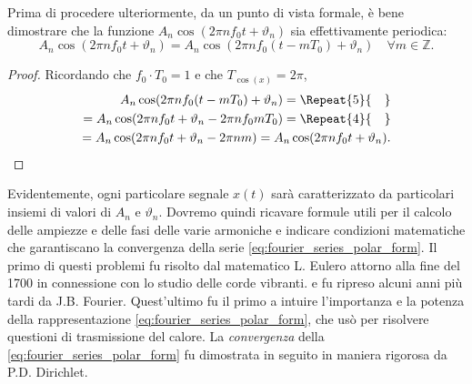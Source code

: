 \documentclass[12pt,oneside,openany]{memoir}
\numberwithin{equation}{subsection}
\newcommand{\quads}[1]{\Repeat{#1}{\quad}}
\begin{document}
\bigbreak
Prima di procedere ulteriormente, da un punto di vista formale, \`e bene
dimostrare che la funzione $A_n \cos(2 \pi n f_0 t + \vartheta_n)$ sia
effettivamente periodica:
\[
	A_n \cos(2 \pi n f_0 t + \vartheta_n) = A_n \cos(2 \pi n f_0 (t - mT_0)
	+ \vartheta_n) \quad \forall m \in \mathbb{Z}.
\]
\begin{proof}
Ricordando che $f_0 \cdot T_0 = 1$ e che $T_{\cos(x)} = 2\pi$,
\begin{equation}
\begin{split}
	A_n \cos(2 \pi n f_0 (t - mT_0) + \vartheta_n) =
	\quads{5}
	\\
	= A_n \cos(2 \pi n f_0 t + \vartheta_n - 2 \pi n f_0 m T_0) =
	\quads{4}
	\\
	= A_n \cos(2 \pi n f_0 t + \vartheta_n - 2 \pi n m) = A_n
	\cos(2 \pi n f_0 t + \vartheta_n).
\end{split}
\end{equation}
\end{proof}
Evidentemente, ogni particolare segnale $x(t)$ sar\`a caratterizzato da
particolari insiemi di valori di $A_n$ e $\vartheta_n$. Dovremo quindi ricavare
formule utili per il calcolo delle ampiezze e delle fasi delle varie armoniche e
indicare condizioni matematiche che garantiscano la convergenza della serie
\eqref{eq:fourier_series_polar_form}. Il primo di questi problemi fu risolto dal
matematico L. Eulero attorno alla fine del 1700 in connessione con lo studio
delle corde vibranti. e fu ripreso alcuni anni pi\`u tardi da J.B. Fourier.
Quest'ultimo fu il primo a intuire l'importanza e la potenza della
rappresentazione \eqref{eq:fourier_series_polar_form}, che us\`o per risolvere
questioni di trasmissione del calore. La \textit{convergenza} della
\eqref{eq:fourier_series_polar_form} fu dimostrata in seguito in maniera
rigorosa da P.D. Dirichlet.

\end{document}
